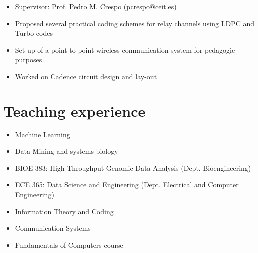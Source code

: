 \documentclass[11pt,a4paper,sans]{moderncv}        %
\begin{document}

\begin{itemize}
\item Supervisor: Prof. Pedro M. Crespo (pcrespo@ceit.es)
\item Proposed several practical coding schemes for relay channels using LDPC and Turbo codes
\item  Set up of a point-to-point wireless communication system for pedagogic purposes
\end{itemize}
\vspace{10pt}

\begin{itemize}
\item Worked on Cadence circuit design and lay-out
\end{itemize}

\section{Teaching experience}
\begin{itemize}
\item Machine Learning
\item Data Mining and systems biology
\end{itemize}
\begin{itemize}
\item BIOE 383: High-Throughput Genomic Data Analysis (Dept. Bioengineering)
\item ECE 365: Data Science and Engineering (Dept. Electrical and Computer Engineering)
\end{itemize}
\vspace{10pt}

\begin{itemize}
\item Information Theory and Coding
\item Communication Systems
\item Fundamentals of Computers course
\end{itemize}
\vspace{10pt}
\end{document}
